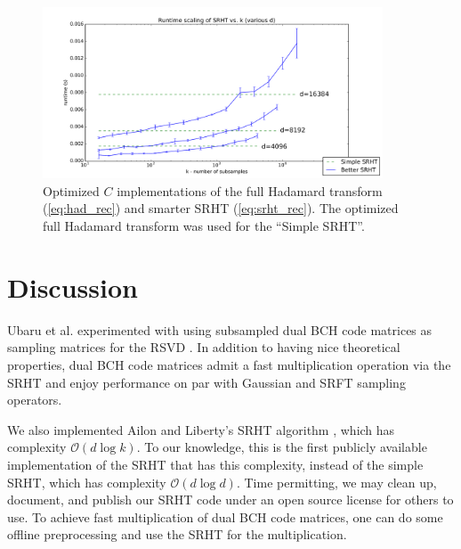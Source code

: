 \documentclass[12pt]{article}
\begin{document}
\begin{figure}[ht!]
   \centering
   \includegraphics[width=0.9\textwidth]{figures/srht_C_k_scaling.pdf}
   \caption{Optimized $C$ implementations of the full Hadamard transform (\ref{eq:had_rec}) and smarter SRHT (\ref{eq:srht_rec}).  The optimized full Hadamard transform was used for the ``Simple SRHT''.}
   \label{fig:srht_C}
\end{figure}


\section{Discussion}
Ubaru et al. experimented with using subsampled dual BCH code matrices as sampling matrices for the RSVD \cite{ubaru2015low}.  In addition to having nice theoretical properties, dual BCH code matrices admit a fast multiplication operation via the SRHT and enjoy performance on par with Gaussian and SRFT sampling operators.

We also implemented Ailon and Liberty's SRHT algorithm \cite{ailon2009fast}, which has complexity $\mathcal{O}(d\log k)$.  To our knowledge, this is the first publicly available implementation of the SRHT that has this complexity, instead of the simple SRHT, which has complexity $\mathcal{O}(d\log d)$.  Time permitting, we may clean up, document, and publish our SRHT code under an open source license for others to use.  To achieve fast multiplication of dual BCH code matrices, one can do some offline preprocessing and use the SRHT for the multiplication.

\newpage 



 
\end{document}
